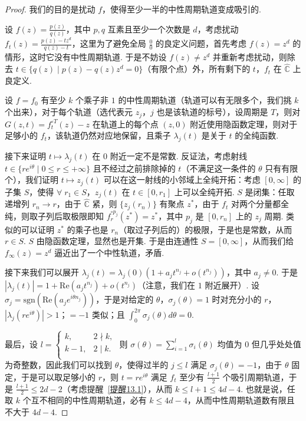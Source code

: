 \documentclass[11pt, a4paper, oneside]{ctexart}
\newcommand{\C}{\mathbb{C}}
\newcommand{\re}{\mathrm{Re}}
\newcommand{\sgn}{\mathrm{sgn}}
\newcommand{\abs}[1]{\left|{#1}\right|}
\begin{document}
    \begin{proof}
        我们的目的是扰动 $f$，使得至少一半的中性周期轨道变成吸引的.

        设 $f(z)=\frac{p(z)}{q(z)}$，其中 $p,q$ 互素且至少一个次数是 $d$，考虑扰动 $f_t(z)=\frac{p(z)-tz^d}{q(z)-t}$，这里为了避免全局 $\frac{0}{0}$ 的良定义问题，首先考虑 $f(z)=z^d$ 的情形，这时它没有中性周期轨道. 于是不妨设 $f(z)\neq z^d$ 并重新考虑扰动，则除去 $t\in \{q(z)\mid p(z)-q(z)z^d=0\}$（有限个点）外，所有剩下的 $t$，$f_t$ 在 $\hat{\C}$ 上良定义.

        设 $f=f_0$ 有至少 $k$ 个乘子非 $1$ 的中性周期轨道（轨道可以有无限多个，我们挑 $k$ 个出来），对于每个轨道（选代表元 $z_j$，$j$ 也是该轨道的标号），设周期是 $T$，则对 $G(z,t)=f_t^{\circ T}(z)-z$ 在轨道上的每个点 $(z,0)$ 附近使用隐函数定理，则对于足够小的 $f_t$，该轨道仍然对应地保留，且乘子 $\lambda_j(t)$ 是关于 $t$ 的全纯函数.

        接下来证明 $t\mapsto \lambda_j(t)$ 在 $0$ 附近一定不是常数. 反证法，考虑射线 $t\in \{re^{i\theta}\mid 0\leq r\leq +\infty\}$ 且不经过之前排除掉的 $t$（不满足这一条件的 $\theta$ 只有有限个），我们证明 $t\mapsto z_j(t)$ 可以在这一射线的小邻域上全纯开拓：考虑 $[0,\infty]$ 的子集 $S$，使得 $\forall\; r_1\in S$，$z_j(t)$ 在 $t\in [0,r_1]$ 上可以全纯开拓. $S$ 是闭集：任取递增列 $r_n\to r$，由于 $\hat{\C}$ 紧，则 $\{z_j(r_n)\}$ 有聚点 $z^*$，由于 $f_t$ 对两个分量都全纯，则取子列后取极限即知 $f_r^{\circ p_j}(z^*)=z^*$，其中 $p_j$ 是 $[0,r_n]$ 上的 $z_j$ 周期. 类似的可以证明 $z^*$ 的乘子也是 $r_n$（取过子列后的）的极限，于是也是常数，从而 $r\in S$. $S$ 由隐函数定理，显然也是开集. 于是由连通性 $S=[0,\infty]$，从而我们给 $f_{\infty}(z)=z^d$ 逼近出了一个中性轨道，矛盾.

        接下来我们可以展开 $\lambda_j(t)=\lambda_j(0)(1+a_j t^{n_j}+o(t^{n_j}))$，其中 $a_j\neq 0$. 于是 $\abs{\lambda_j(t)}=1+\re(a_j t^{n_j})+o(t^{n_j})$（注意，我们在 $1$ 附近展开）. 设 $\sigma_j=\sgn(\re(a_j e^{i\theta n_j}))$，于是对给定的 $\theta$，$\sigma_j(\theta)=1$ 时对充分小的 $r$，$\abs{\lambda_j(re^{i\theta})}>1$；$=-1$ 类似；且 $\int_{0}^{2\pi}\sigma_j(\theta)d\theta=0$.

        最后，设 $l=\begin{cases}
            k,&2\nmid k,\\
            k-1,&2\mid k.\\
        \end{cases}$ 则 $\sigma(\theta)=\sum\limits_{i=1}^{l}\sigma_i(\theta)$ 均值为 $0$ 但几乎处处值为奇整数，因此我们可以找到 $\theta$，使得过半的 $j\leq l$ 满足 $\sigma_j(\theta)=-1$，由于 $\theta$ 固定，于是可以取足够小的 $r$，则 $t=re^{i\theta}$ 满足 $f_t$ 至少有 $\frac{l+1}{2}$ 个吸引周期轨道，于是 $\frac{l+1}{2}\leq 2d-2$（考虑提醒~\ref{提醒13.1}），从而 $k\leq l+1\leq 4d-4$. 也就是说，任取 $k$ 个互不相同的中性周期轨道，必有 $k\leq 4d-4$，从而中性周期轨道数有限且不大于 $4d-4$.
    \end{proof}
\end{document}
